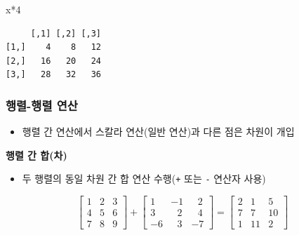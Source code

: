 \documentclass[
  11pt,
]{krantz}
\newenvironment{Shaded}{\begin{snugshade}}{\end{snugshade}}
\newcommand{\DecValTok}[1]{\textcolor[rgb]{0.06,0.06,0.06}{#1}}
\newcommand{\NormalTok}[1]{#1}
\newcommand{\SpecialCharTok}[1]{\textcolor[rgb]{0,0,0}{#1}}
\providecommand{\tightlist}{%
  \setlength{\itemsep}{0pt}\setlength{\parskip}{0pt}}
\begin{document}
\footnotesize

\begin{Shaded}
\begin{Highlighting}[]
\NormalTok{x}\SpecialCharTok{*}\DecValTok{4}
\end{Highlighting}
\end{Shaded}

\begin{verbatim}
     [,1] [,2] [,3]
[1,]    4    8   12
[2,]   16   20   24
[3,]   28   32   36
\end{verbatim}

\normalsize

\hypertarget{mat-op-m}{%
\subsubsection*{\texorpdfstring{\textbf{행렬-행렬 연산}}{행렬-행렬 연산}}\label{mat-op-m}}


\begin{itemize}
\tightlist
\item
  행렬 간 연산에서 스칼라 연산(일반 연산)과 다른 점은 차원이 개입
\end{itemize}

\textbf{행렬 간 합(차)}

\begin{itemize}
\tightlist
\item
  두 행렬의 동일 차원 간 합 연산 수행(\texttt{+} 또는 \texttt{-} 연산자 사용)
\end{itemize}

\[\begin{bmatrix}
1 & 2 & 3 \\
4 & 5 & 6 \\ 
7 & 8 & 9
\end{bmatrix} +  
\begin{bmatrix}
1 & -1 & ~~~2 \\
3 & ~~~2 & ~~~4 \\ 
-6 & ~~~3 & -7
\end{bmatrix} 
 = 
\begin{bmatrix}
2  & 1  & 5 \\
7  & 7  & 10 \\ 
1  & 11 & 2
\end{bmatrix}
\]

\footnotesize
\end{document}
